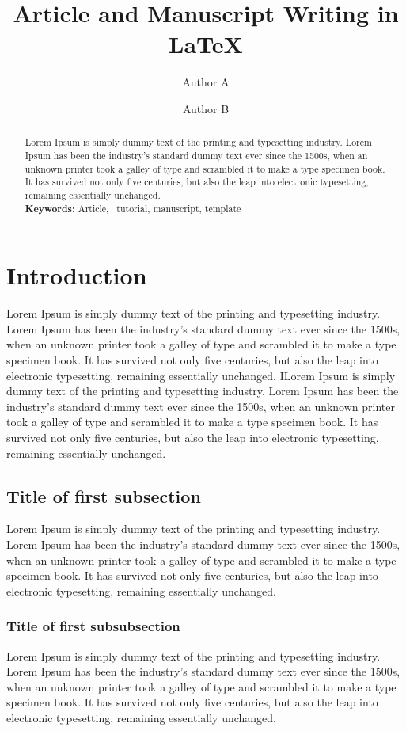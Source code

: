 \documentclass[10pt, a4paper]{article}
\title{\vspace{-15mm} Article and Manuscript Writing in \LaTeX}
\author[1]{Author A}
\author[2]{Author B}
\affil[1]{Department of XYZ}
\affil[2]{Department of ABC}
\begin{document}
\maketitle

\begin{abstract}
	Lorem Ipsum is simply dummy text of the printing and typesetting industry. Lorem Ipsum has been the industry's standard dummy text ever since the 1500s, when an unknown printer took a galley of type and scrambled it to make a type specimen book. It has survived not only five centuries, but also the leap into electronic typesetting, remaining essentially unchanged. \\

	\noindent
	\textbf{Keywords:} Article, \LaTeXe\ tutorial, manuscript, template
\end{abstract}


\section{Introduction}
Lorem Ipsum is simply dummy text of the printing and typesetting industry. Lorem Ipsum has been the industry's standard dummy text ever since the 1500s, when an unknown printer took a galley of type and scrambled it to make a type specimen book. It has survived not only five centuries, but also the leap into electronic typesetting, remaining essentially unchanged. ILorem Ipsum is simply dummy text of the printing and typesetting industry. Lorem Ipsum has been the industry's standard dummy text ever since the 1500s, when an unknown printer took a galley of type and scrambled it to make a type specimen book. It has survived not only five centuries, but also the leap into electronic typesetting, remaining essentially unchanged.

\subsection{Title of first subsection}
Lorem Ipsum is simply dummy text of the printing and typesetting industry. Lorem Ipsum has been the industry's standard dummy text ever since the 1500s, when an unknown printer took a galley of type and scrambled it to make a type specimen book. It has survived not only five centuries, but also the leap into electronic typesetting, remaining essentially unchanged.

\subsubsection{Title of first subsubsection}
Lorem Ipsum is simply dummy text of the printing and typesetting industry. Lorem Ipsum has been the industry's standard dummy text ever since the 1500s, when an unknown printer took a galley of type and scrambled it to make a type specimen book. It has survived not only five centuries, but also the leap into electronic typesetting, remaining essentially unchanged.
\end{document}
